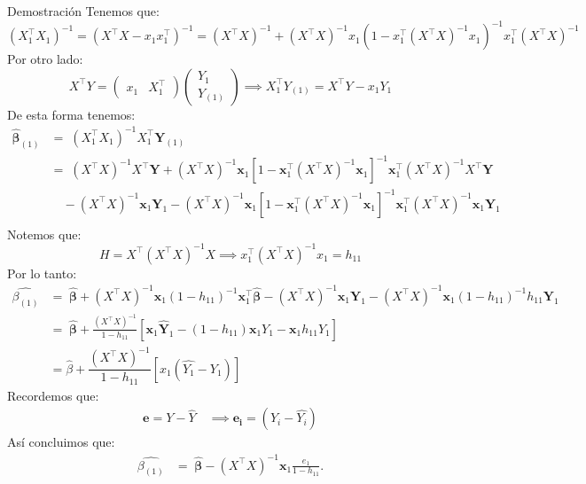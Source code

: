 \documentclass[a4paper,11pt]{article}
\begin{document}
\begin{demostracion}{Demostración}
Tenemos que:
\[
(X_1^\top X_1)^{-1} =(X^\top X-x_1x_1^\top)^{-1}= (X^\top X)^{-1}+(X^\top X)^{-1}x_1(1-x_1^\top (X^\top X)^{-1}x_1)^{-1}x_1^\top(X^\top X)^{-1}
\]
Por otro lado:
\[
X^\top Y=\begin{pmatrix}
    x_1&X_1^\top
\end{pmatrix}\begin{pmatrix}
    Y_1\\
    Y_{(1)}
\end{pmatrix}\implies X_1^\top Y_{(1)}=X^\top Y-x_{1}Y_1
\]
De esta forma tenemos:
\begin{align*}
\widehat{\boldsymbol{\beta}}_{(1)} & = \;(X_1^{\top}X_1)^{-1}X_1^{\top}\boldsymbol{Y}_{(1)}\\[5pt]
&= \; (X^{\top}X)^{-1}X^{\top}\boldsymbol{Y}+(X^{\top}X)^{-1}\boldsymbol{x}_1\left[1-\boldsymbol{x}_1^{\top}(X^{\top}X)^{-1}\boldsymbol{x}_1\right]^{-1}\boldsymbol{x}_1^{\top}(X^{\top}X)^{-1}X^{\top}\boldsymbol{Y} \\
    & \quad -(X^{\top}X)^{-1}\boldsymbol{x}_1\boldsymbol{Y}_1 -(X^{\top}X)^{-1}\boldsymbol{x}_1\left[1-\boldsymbol{x}_1^{\top}(X^{\top}X)^{-1}\boldsymbol{x}_1\right]^{-1}\boldsymbol{x}_1^{\top}(X^{\top}X)^{-1}\boldsymbol{x}_1\boldsymbol{Y}_1 \\[10pt]
\end{align*}
Notemos que:
\[
H=X^\top (X^\top X)^{-1}X\implies x_1^\top(X^\top X)^{-1}x_1=h_{11}
\]
Por lo tanto:
\begin{align*}
    \hat{\beta_{(1)} }& = \; \widehat{\boldsymbol{\beta}}+(X^{\top}X)^{-1}\boldsymbol{x}_1(1-h_{11})^{-1}\boldsymbol{x}_1^{\top}\widehat{\boldsymbol{\beta}}
    -(X^{\top}X)^{-1}\boldsymbol{x}_1\boldsymbol{Y}_1 -(X^{\top}X)^{-1}\boldsymbol{x}_1(1-h_{11})^{-1}h_{11}\boldsymbol{Y}_1 \\[5pt]
& = \; \widehat{\boldsymbol{\beta}}+\frac{(X^{\top}X)^{-1}}{1-h_{11}} \left[
     \boldsymbol{x}_1\widehat{\boldsymbol{Y}}_1 - (1-h_{11})\boldsymbol{x}_1Y_1 - \boldsymbol{x}_1h_{11}Y_1\right]\\[5pt]
     &=\hat{\beta}+\dfrac{(X^\top X)^{-1} }{1-h_{11} }\left[x_1(\hat{Y_1}-Y_1) \right]
\end{align*}
Recordemos que:
\begin{align*}
    \mathbf{e}=Y-\hat{Y}\quad \implies\mathbf{e_i}=(Y_i-\hat{Y_i} )
\end{align*}
Así concluimos que:
\begin{align*}
    \hat{\beta_{(1)} } 
& = \; \widehat{\boldsymbol{\beta}}-(X^{\top}X)^{-1}\boldsymbol{x}_1 \frac{e_1}{1-h_{11}}.
\end{align*}

\end{demostracion}
\end{document}

